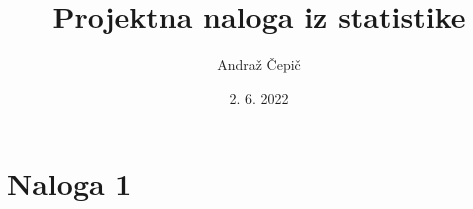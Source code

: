 \documentclass{article}
\title{Projektna naloga iz statistike}
\author{Andraž Čepič}
\date{2. 6. 2022}
\begin{document}
\maketitle

\section*{Naloga 1}
\end{document}
